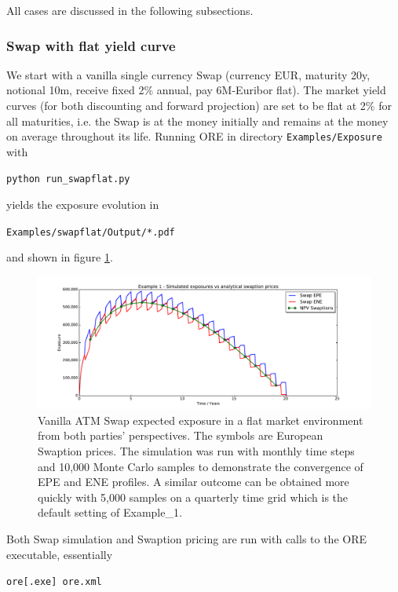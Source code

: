All cases are discussed in the following subsections.

\subsubsection{Swap with flat yield curve}\label{example:exposure_swapflat}

We start with a vanilla single currency Swap (currency EUR, maturity 20y, notional 10m, receive fixed 2\% annual, pay
6M-Euribor flat). The market yield curves (for both discounting and forward projection) are set to be flat at 2\% for
all maturities, i.e. the Swap is at the money initially and remains at the money on average throughout its life. Running
ORE in directory {\tt Examples/Exposure} with

\medskip
\centerline{\tt python run\_swapflat.py } 
\medskip

yields the exposure evolution in 

\medskip
\centerline{\tt Examples/swapflat/Output/*.pdf } 
\medskip

and shown in figure \ref{fig_1}. 
\begin{figure}[h!]
\begin{center}
\includegraphics[scale=0.45]{examples/mpl_swap_1_1m_sbb_10k_flat.pdf}
\end{center}
\caption{Vanilla ATM Swap expected exposure in a flat market environment from both parties' perspectives. The symbols are European Swaption prices. The simulation was run with monthly time steps and 10,000 Monte Carlo samples to demonstrate the convergence of EPE and ENE profiles. A similar
outcome can be obtained more quickly with 5,000 samples on a quarterly time grid which is the default setting of Example\_1. }
\label{fig_1}
\end{figure}
Both Swap simulation and Swaption pricing are run with calls to the ORE executable, essentially 

\medskip
\centerline{\tt ore[.exe] ore.xml} 


